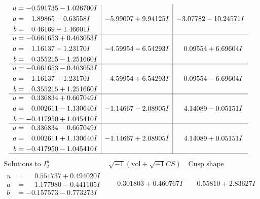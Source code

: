 \documentclass[1p]{elsarticle_modified}
\theoremstyle{definition}
\newcommand{\I}{\sqrt{-1}}
\begin{document}
$$\begin{array}{c|c|c}
\begin{aligned}
u &= -0.591735 - 1.026700 I \\
a &= \phantom{-}1.89865 - 0.63558 I \\
b &= \phantom{-}0.46169 + 1.46601 I\end{aligned}
 & -5.99007 + 9.94125 I & -3.07782 - 10.24571 I \\ \hline\begin{aligned}
u &= -0.661653 + 0.463053 I \\
a &= \phantom{-}1.16137 - 1.23170 I \\
b &= \phantom{-}0.355215 - 1.251660 I\end{aligned}
 & -4.59954 - 6.54293 I & \phantom{-}0.09554 + 6.69604 I \\ \hline\begin{aligned}
u &= -0.661653 - 0.463053 I \\
a &= \phantom{-}1.16137 + 1.23170 I \\
b &= \phantom{-}0.355215 + 1.251660 I\end{aligned}
 & -4.59954 + 6.54293 I & \phantom{-}0.09554 - 6.69604 I \\ \hline\begin{aligned}
u &= \phantom{-}0.336834 + 0.667049 I \\
a &= \phantom{-}0.002611 - 1.130640 I \\
b &= -0.417950 + 1.045410 I\end{aligned}
 & -1.14667 - 2.08905 I & \phantom{-}4.14089 - 0.05151 I \\ \hline\begin{aligned}
u &= \phantom{-}0.336834 - 0.667049 I \\
a &= \phantom{-}0.002611 + 1.130640 I \\
b &= -0.417950 - 1.045410 I\end{aligned}
 & -1.14667 + 2.08905 I & \phantom{-}4.14089 + 0.05151 I\\
 \hline 
 \end{array}$$\newpage$$\begin{array}{c|c|c}  
\text{Solutions to }I^u_{2}& \I (\text{vol} + \sqrt{-1}CS) & \text{Cusp shape}\\
 \hline 
\begin{aligned}
u &= \phantom{-}0.551737 + 0.494020 I \\
a &= \phantom{-}1.177980 - 0.441105 I \\
b &= -0.157573 - 0.773273 I\end{aligned}
 & \phantom{-}0.301803 + 0.460767 I & \phantom{-}0.55810 + 2.83627 I \\ \hline\begin{aligned}

\end{aligned}
\end{array}$$
\end{document}
